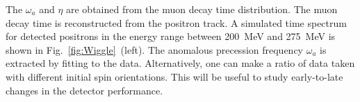 

The $\omega_a$ and $\eta$ are obtained from the muon decay time distribution.
The muon decay time is reconstructed from the positron track.
A simulated time spectrum for detected positrons in the energy range 
between 200~MeV and 275~MeV is shown in Fig.~\ref{fig:Wiggle}~(left).
The anomalous precession frequency $\omega_a$ is extracted by fitting to the data. 
Alternatively, one can make a ratio of 
data taken with different initial spin orientations.
This will be useful to study early-to-late changes in the detector performance.

